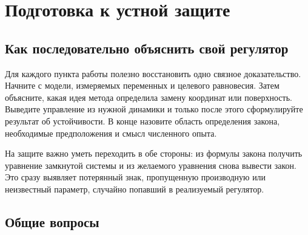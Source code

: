 \section{Подготовка к устной защите}
\label{sec:defense}

\subsection{Как последовательно объяснить свой регулятор}

Для каждого пункта работы полезно восстановить одно связное доказательство.
Начните с модели, измеряемых переменных и целевого равновесия. Затем
объясните, какая идея метода определила замену координат или поверхность.
Выведите управление из нужной динамики и только после этого сформулируйте
результат об устойчивости. В конце назовите область определения закона,
необходимые предположения и смысл численного опыта.

На защите важно уметь переходить в обе стороны: из формулы закона получить
уравнение замкнутой системы и из желаемого уравнения снова вывести закон.
Это сразу выявляет потерянный знак, пропущенную производную или неизвестный
параметр, случайно попавший в реализуемый регулятор.

\subsection{Общие вопросы}

